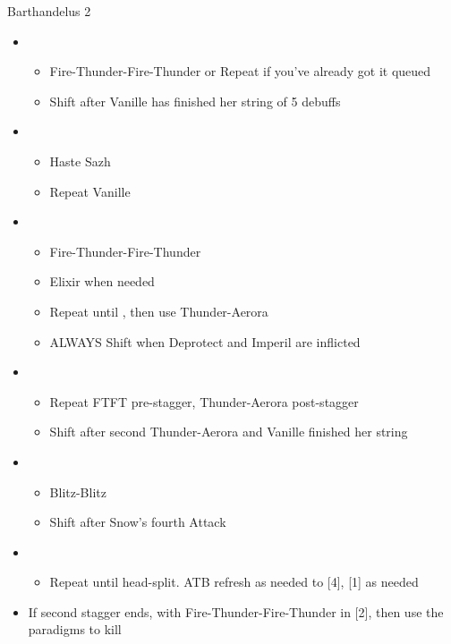 \begin{battle}{Barthandelus 2}
\begin{multicols}{2}
\begin{itemize}
    \item \third
    \begin{itemize}
        \item Fire-Thunder-Fire-Thunder or Repeat if you've already got it queued
        \item Shift after Vanille has finished her string of 5 debuffs
    \end{itemize}
    \item \fifth
    \begin{itemize}
        \item Haste Sazh
        \item Repeat Vanille
    \end{itemize}
    \item \third
    \begin{itemize}
        \item Fire-Thunder-Fire-Thunder
        \item Elixir when needed
        \item Repeat until \stagger, then use Thunder-Aerora
        \item ALWAYS Shift when Deprotect and Imperil are inflicted
    \end{itemize}
    \item \second
    \begin{itemize}
        \item Repeat FTFT pre-stagger, Thunder-Aerora post-stagger
        \item Shift after second Thunder-Aerora and Vanille finished her string
    \end{itemize}
    \item \first
    \begin{itemize}
        \item Blitz-Blitz
        \item Shift after Snow's fourth Attack
    \end{itemize}
    \item \sixth
    \begin{itemize}
        \item Repeat until head-split. ATB refresh as needed to [4], [1] as needed
    \end{itemize}
    \item If second stagger ends, \stagger with Fire-Thunder-Fire-Thunder in [2], then use the \com paradigms to kill
\end{itemize}
\null
\end{multicols}
\end{battle}
